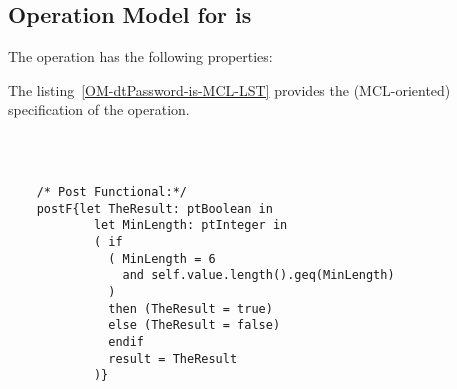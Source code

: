 \subsection{Operation Model for is}

\label{OM-is}


The  operation has the following properties:

	\begin{operationmodel}



		


	\end{operationmodel}



	\vspace{1cm}
	The listing~\ref{OM-dtPassword-is-MCL-LST} provides the \msrmessir (MCL-oriented) specification of the operation.
	
	\scriptsize
	\vspace{0.5cm}
	\begin{lstlisting}[style=MessirStyle,firstnumber=auto,captionpos=b,caption={\msrmessir (MCL-oriented) specification of the operation \emph{is}.},label=OM-dtPassword-is-MCL-LST]

	
	
	/* Post Functional:*/ 
	postF{let TheResult: ptBoolean in
	        let MinLength: ptInteger in
	        ( if
	          ( MinLength = 6
	            and self.value.length().geq(MinLength)
	          )
	          then (TheResult = true)
	          else (TheResult = false)
	          endif
	          result = TheResult
	        )}
	
	
	\end{lstlisting}
	\normalsize 
	
	
	
	





